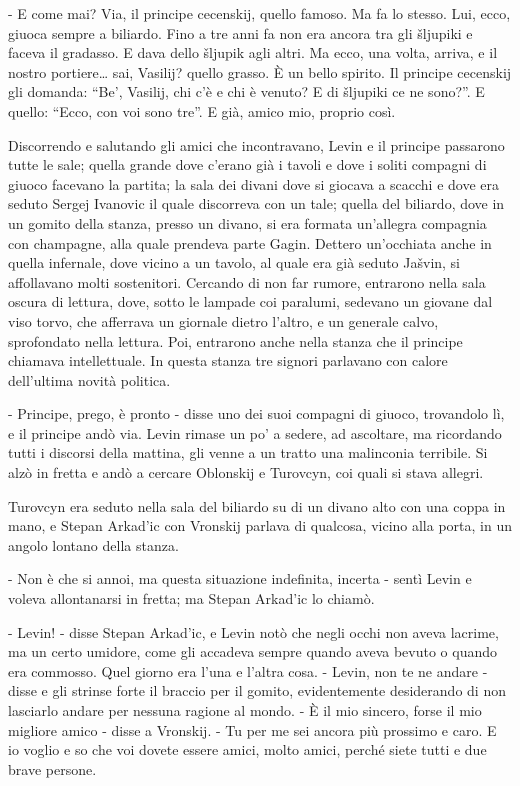 - E come mai? Via, il principe cecenskij, quello famoso. Ma fa lo stesso. Lui, ecco, giuoca sempre a biliardo. Fino a tre anni fa non era ancora tra gli šljupiki e faceva il gradasso. E dava dello šljupik agli altri. Ma ecco, una volta, arriva, e il nostro portiere\ldots{} sai, Vasilij? quello grasso. È un bello spirito. Il principe cecenskij gli domanda: ``Be', Vasilij, chi c'è e chi è venuto? E di šljupiki ce ne sono?''. E quello: ``Ecco, con voi sono tre''. E già, amico mio, proprio così. 

Discorrendo e salutando gli amici che incontravano, Levin e il principe passarono tutte le sale; quella grande dove c'erano già i tavoli e dove i soliti compagni di giuoco facevano la partita; la sala dei divani dove si giocava a scacchi e dove era seduto Sergej Ivanovic il quale discorreva con un tale; quella del biliardo, dove in un gomito della stanza, presso un divano, si era formata un'allegra compagnia con champagne, alla quale prendeva parte Gagin. Dettero un'occhiata anche in quella infernale, dove vicino a un tavolo, al quale era già seduto Jašvin, si affollavano molti sostenitori. Cercando di non far rumore, entrarono nella sala oscura di lettura, dove, sotto le lampade coi paralumi, sedevano un giovane dal viso torvo, che afferrava un giornale dietro l'altro, e un generale calvo, sprofondato nella lettura. Poi, entrarono anche nella stanza che il principe chiamava intellettuale. In questa stanza tre signori parlavano con calore dell'ultima novità politica. 

- Principe, prego, è pronto - disse uno dei suoi compagni di giuoco, trovandolo lì, e il principe andò via. Levin rimase un po' a sedere, ad ascoltare, ma ricordando tutti i discorsi della mattina, gli venne a un tratto una malinconia terribile. Si alzò in fretta e andò a cercare Oblonskij e Turovcyn, coi quali si stava allegri. 

Turovcyn era seduto nella sala del biliardo su di un divano alto con una coppa in mano, e Stepan Arkad'ic con Vronskij parlava di qualcosa, vicino alla porta, in un angolo lontano della stanza. 

- Non è che si annoi, ma questa situazione indefinita, incerta - sentì Levin e voleva allontanarsi in fretta; ma Stepan Arkad'ic lo chiamò. 

- Levin! - disse Stepan Arkad'ic, e Levin notò che negli occhi non aveva lacrime, ma un certo umidore, come gli accadeva sempre quando aveva bevuto o quando era commosso. Quel giorno era l'una e l'altra cosa. - Levin, non te ne andare - disse e gli strinse forte il braccio per il gomito, evidentemente desiderando di non lasciarlo andare per nessuna ragione al mondo. - È il mio sincero, forse il mio migliore amico - disse a Vronskij. - Tu per me sei ancora più prossimo e caro. E io voglio e so che voi dovete essere amici, molto amici, perché siete tutti e due brave persone. 

